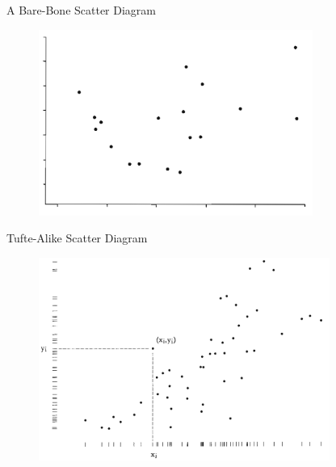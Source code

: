 \documentclass[notes, aspectratio=1610]{beamer}
\begin{document}
\begin{frame}{A Bare-Bone Scatter Diagram}{}
\begin{figure}
		\begin{center}
			\includegraphics[width=0.8\textwidth]{images/trad_scatter.png}
		\end{center}
	\end{figure}

\end{frame}

\begin{frame}{Tufte-Alike Scatter Diagram}{}
\begin{figure}
		\begin{center}
			\includegraphics[width=0.85\textwidth]{images/tufte_scatter.png}
		\end{center}
	\end{figure}

\end{frame}
\end{document}
